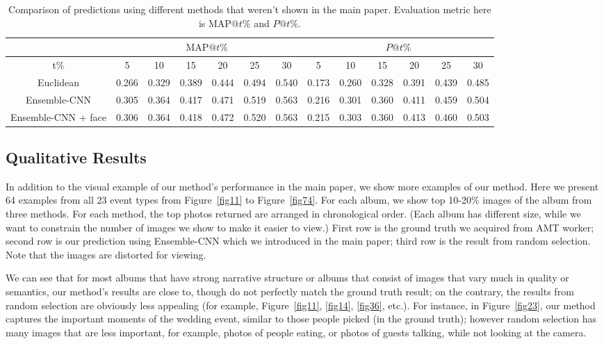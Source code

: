 \documentclass[10pt,twocolumn,letterpaper]{article}
\begin{document}
\begin{table}[t]
\small
\begin{tabular}{c|cccccc|cccccc}
\hline
          & \multicolumn{6}{c|}{$\text{MAP}@t\%$}          & \multicolumn{6}{c}{$P@t\%$} \\ \hline  \hline
t\%       & 5     & 10    & 15    & 20    & 25    & 30    & 5  & 10  & 15 & 20 & 25 & 30 \\ \hline
Euclidean & 0.266&0.329 & 0.389 & 0.444 & 0.494 & 0.540  & 0.173  &  0.260   &  0.328  &  0.391  & 0.439   & 0.485   \\
Ensemble-CNN & 0.305& 0.364& 0.417& 0.471& 0.519&0.563& 0.216&0.301& 0.360& 0.411&0.459&0.504 \\
Ensemble-CNN + face &0.306&0.364&0.418&0.472&0.520&0.563&0.215&0.303&0.360&0.413&0.460&0.503 \\ \hline
\end{tabular}
\caption{Comparison of predictions using different methods that weren't shown in the main paper. Evaluation metric here is $\text{MAP}@t\%$ and $P@t\%$.}
\label{aesthetic_table}
\end{table}

\clearpage

\subsection{Qualitative Results}
In addition to the visual example of our method's performance in the main paper, we show more examples of our method. Here we present 64 examples from all 23 event types from Figure~\ref{fig11} to Figure~\ref{fig74}. For each album, we show top 10-20\% images of the album from three methods. For each method, the top photos returned are arranged in chronological	order.
(Each album has different size, while we want to constrain the number of images we show to make it easier to view.) First row is the ground truth we acquired from AMT worker; second row is our prediction using Ensemble-CNN which we introduced in the main paper; third row is the result from random selection. Note that the images are distorted for viewing.

 We can see that for most albums that have strong narrative structure or albums that consist of images that vary much in quality or semantics, our method's results are close to, though do not perfectly match the ground truth result; on the contrary, the results from random selection are obviously less appealing (for example,  Figure~\ref{fig11}, \ref{fig14}, \ref{fig36}, etc.).  For instance, in Figure~\ref{fig23}, our method captures the important moments of the wedding event, similar to those people picked (in the ground truth); however random selection has many images that are less important, for example, photos of people eating, or photos of guests talking, while not looking at the camera.
 
\end{document}
